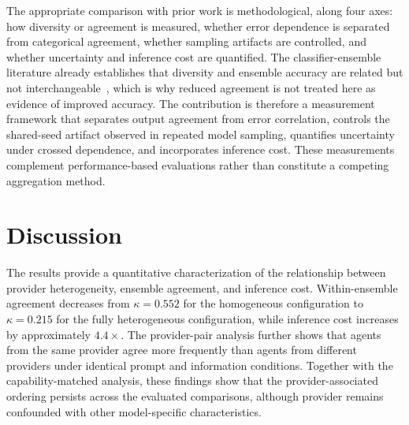 \documentclass{ieeeaccess}
\begin{document}
The appropriate comparison with prior work is methodological, along four axes:
how diversity or agreement is measured, whether error dependence is separated
from categorical agreement, whether sampling artifacts are controlled, and
whether uncertainty and inference cost are quantified. The classifier-ensemble
literature already establishes that diversity and ensemble accuracy are related
but not interchangeable~\cite{kuncheva2003diversity}, which is why reduced
agreement is not treated here as evidence of improved accuracy. The contribution
is therefore a measurement framework that separates output agreement from error
correlation, controls the shared-seed artifact observed in repeated model
sampling, quantifies uncertainty under crossed dependence, and incorporates
inference cost. These measurements complement performance-based evaluations
rather than constitute a competing aggregation method.

\section{Discussion}
The results provide a quantitative characterization of the relationship between
provider heterogeneity, ensemble agreement, and inference cost. Within-ensemble
agreement decreases from $\kappa=0.552$ for the homogeneous configuration to
$\kappa=0.215$ for the fully heterogeneous configuration, while inference cost
increases by approximately $4.4\times$. The provider-pair analysis further shows
that agents from the same provider agree more frequently than agents from
different providers under identical prompt and information conditions. Together
with the capability-matched analysis, these findings show that the
provider-associated ordering persists across the evaluated comparisons, although
provider remains confounded with other model-specific characteristics.
\end{document}
